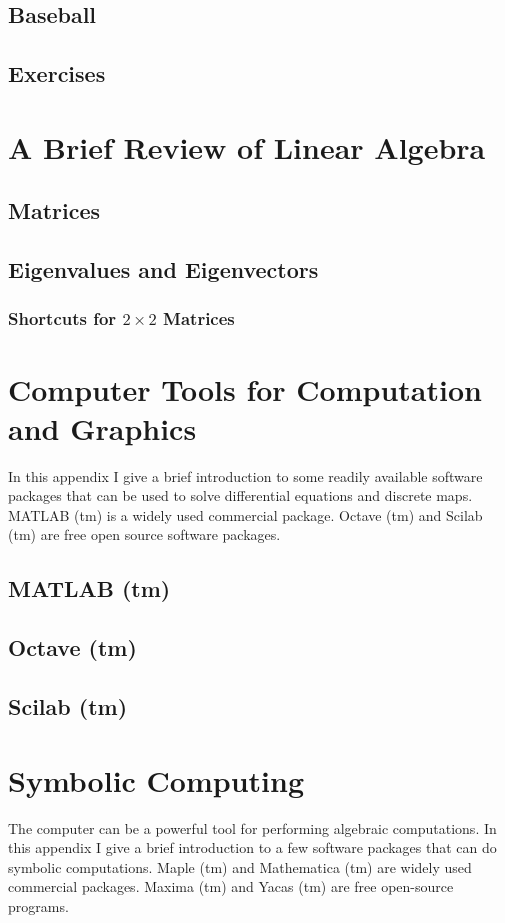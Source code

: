 \documentclass{book}
\begin{document}
\section{Baseball}
\section{Exercises}
\appendix
\chapter{A Brief Review of Linear Algebra}
\section{Matrices}
\section{Eigenvalues and Eigenvectors}
\subsection{Shortcuts for $2\times 2$ Matrices}
\chapter[Computer Tools]{Computer Tools for Computation and Graphics}
%
%
In this appendix I give a brief introduction to some
readily available software packages that can be used to solve
differential equations and discrete maps.  MATLAB (tm)
is a widely used commercial package.  Octave (tm) and
Scilab (tm) are free open source software packages. 
\section{MATLAB (tm)}
\section{Octave (tm)}
\section{Scilab (tm)}
\chapter{Symbolic Computing}
The computer can be a powerful tool for performing
algebraic computations.  In this appendix I give a brief introduction
to a few software packages that can do symbolic computations.
Maple (tm) and Mathematica (tm) are widely used commercial
packages.  Maxima (tm) and Yacas (tm) are free open-source
programs.
\end{document}
